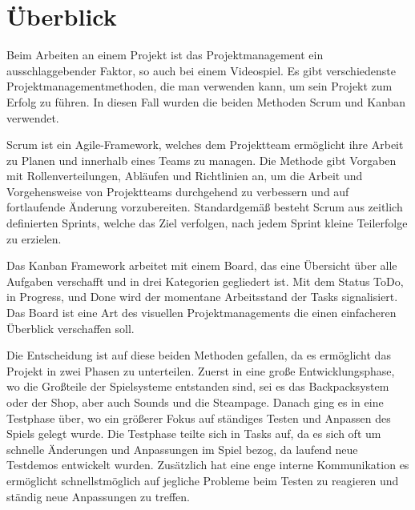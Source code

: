 
\section{Überblick}\label{sec:ueberblick}

\renewcommand{\kapitelautor}{Autor: Nils} %

%
Beim Arbeiten an einem Projekt ist das Projektmanagement ein ausschlaggebender Faktor, so auch bei einem Videospiel. Es gibt verschiedenste Projektmanagementmethoden, die man verwenden kann, um sein Projekt zum Erfolg zu führen.
In diesen Fall wurden die beiden Methoden Scrum und Kanban verwendet.

Scrum ist ein Agile-Framework, welches dem Projektteam ermöglicht ihre Arbeit zu Planen und innerhalb eines Teams zu managen.
Die Methode gibt Vorgaben mit Rollenverteilungen, Abläufen und Richtlinien an, um die Arbeit und Vorgehensweise von Projektteams durchgehend zu verbessern und auf fortlaufende Änderung vorzubereiten.
Standardgemäß besteht Scrum aus zeitlich definierten Sprints, welche das Ziel verfolgen, nach jedem Sprint kleine Teilerfolge zu erzielen. 


\cite{Scrum}


Das Kanban Framework arbeitet mit einem Board, das eine Übersicht über alle Aufgaben verschafft und in drei Kategorien gegliedert ist.
Mit dem Status ToDo, in Progress, und Done wird der momentane Arbeitsstand der Tasks signalisiert. Das Board ist eine Art des visuellen Projektmanagements die einen einfacheren Überblick verschaffen soll.


Die Entscheidung ist auf diese beiden Methoden gefallen, da es ermöglicht das Projekt in zwei Phasen zu unterteilen.
Zuerst in eine große Entwicklungsphase, wo die Großteile der Spielsysteme entstanden sind, sei es das Backpacksystem oder der Shop, aber auch Sounds und die Steampage.
Danach ging es in eine Testphase über, wo ein größerer Fokus auf ständiges Testen und Anpassen des Spiels gelegt wurde.
Die Testphase teilte sich in Tasks auf, da es sich oft um schnelle Änderungen und Anpassungen im Spiel bezog, da laufend neue Testdemos entwickelt wurden.
Zusätzlich hat eine enge interne Kommunikation es ermöglicht schnellstmöglich auf jegliche Probleme beim Testen zu reagieren und ständig neue Anpassungen zu treffen.

%

\renewcommand{\kapitelautor}{}

